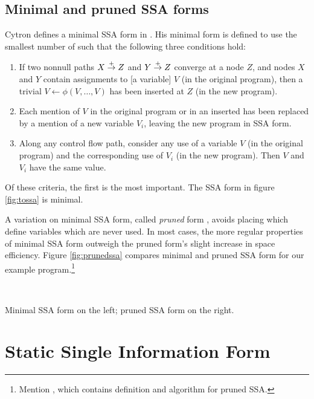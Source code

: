 \documentclass[12pt,notitlepage]{article}
\begin{document}
\subsection{Minimal and pruned SSA forms}
Cytron defines a minimal SSA form in \cite{cytron91:ssa}.  His minimal
form is defined to use the smallest number of  such
that the following three conditions hold:
\begin{enumerate}
\item If two nonnull paths $X \stackrel{+}{\rightarrow} Z$ and $Y \stackrel{+}{\rightarrow} Z$
converge at a node $Z$, and nodes $X$ and $Y$ contain assignments to
[a variable] $V$ (in the original program), then a trivial
\phifunction{} $V \leftarrow \phi(V, \ldots, V)$ has been inserted at
$Z$ (in the new program). \label{criteria1}
\item Each mention of $V$ in the original program or in an inserted
\phifunction{} has been replaced by a mention of a new variable $V_i$,
leaving the new program in SSA form.
\item Along any control flow path, consider any use of a variable $V$
(in the original program) and the corresponding use of $V_i$ (in the
new program).  Then $V$ and $V_i$ have the same value.
\end{enumerate}
Of these criteria, the first %
is the most important.
The SSA form in figure \ref{fig:tossa} is minimal.

A variation
on minimal SSA form, called \emph{pruned} form \cite{ferrante91:pruned},
avoids placing  which define variables which are never used.
In most cases, the more regular properties of minimal SSA form
outweigh the pruned form's slight increase in space efficiency.
Figure \ref{fig:prunedssa} compares minimal and pruned SSA form for
our example program.\footnote{Mention \cite{ferrante91:pruned}, which
contains definition and algorithm for pruned SSA.}
\begin{myfigure}
\begin{center}
 \vline\ 
\end{center}
\caption{Minimal SSA form on the left; pruned SSA form on the right.}
\label{fig:prunedssa}
\end{myfigure}

\section{Static Single Information Form}
\end{document}
